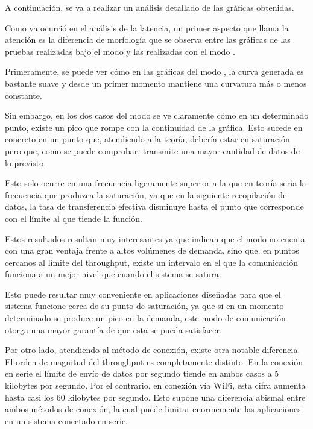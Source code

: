 \documentclass[a4paper,11pt,spanish]{sphinxmanual}
\begin{document}
\sphinxAtStartPar
A continuación, se va a realizar un análisis detallado de las gráficas obtenidas.

\sphinxAtStartPar
Como ya ocurrió en el análisis de la latencia, un primer aspecto que llama la
atención es la diferencia de morfología que se observa entre las gráficas de las
pruebas realizadas bajo el modo  y las realizadas con el modo .

\sphinxAtStartPar
Primeramente, se puede ver cómo en las gráficas del modo , la curva
generada es bastante suave y desde un primer momento mantiene una curvatura más o
menos constante.

\sphinxAtStartPar
Sin embargo, en los dos casos del modo  se ve claramente cómo en un determinado
punto, existe un pico que rompe con la continuidad de la gráfica. Esto sucede
en concreto en un punto que, atendiendo a la teoría, debería estar en saturación pero que,
como se puede comprobar, transmite una mayor cantidad de datos de lo previsto.

\sphinxAtStartPar
Esto solo ocurre en una frecuencia ligeramente superior a la que en teoría sería
la frecuencia que produzca la saturación, ya que en la siguiente recopilación de
datos, la tasa de transferencia efectiva disminuye hasta el punto que corresponde con
el límite al que tiende la función.

\sphinxAtStartPar
Estos resultados resultan muy interesantes ya que indican que el modo 
no cuenta con una gran ventaja frente a altos volúmenes de demanda, sino que, en puntos
cercanos al límite del throughput, existe un intervalo en el que la comunicación
funciona a un mejor nivel que cuando el sistema se satura.

\sphinxAtStartPar
Esto puede resultar muy conveniente en aplicaciones diseñadas para que el sistema
funcione cerca de su punto de saturación, ya que si en un momento determinado se produce
un pico en la demanda, este modo de comunicación otorga una mayor garantía de que
esta se pueda satisfacer.

\sphinxAtStartPar
Por otro lado, atendiendo al método de conexión, existe otra notable diferencia. El
orden de magnitud del throughput es completamente distinto. En la conexión en serie
el límite de envío de datos por segundo tiende en ambos casos a 5 kilobytes por segundo.
Por el contrario, en conexión vía Wi\sphinxhyphen{}Fi, esta cifra aumenta hasta casi los 60 kilobytes
por segundo. Esto supone una diferencia abismal entre ambos métodos de conexión, la cual
puede limitar enormemente las aplicaciones en un sistema conectado en serie.
\end{document}
